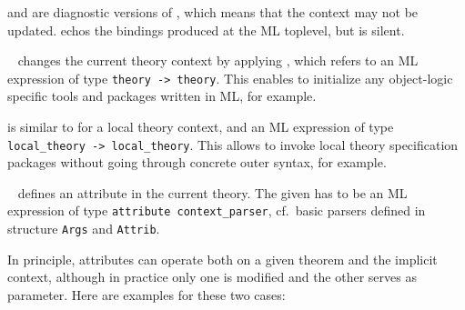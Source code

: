 \begin{isabellebody}
\begin{isamarkuptext}
\begin{description}
  \item \hyperlink{command.ML-val}{\mbox{}} and \hyperlink{command.ML-command}{\mbox{}} are diagnostic
  versions of \hyperlink{command.ML}{\mbox{}}, which means that the context may not be
  updated.  \hyperlink{command.ML-val}{\mbox{}} echos the bindings produced at the ML
  toplevel, but \hyperlink{command.ML-command}{\mbox{}} is silent.
  
  \item \hyperlink{command.setup}{\mbox{}}~ changes the current theory
  context by applying , which refers to an ML expression
  of type \verb|theory -> theory|.  This enables to initialize
  any object-logic specific tools and packages written in ML, for
  example.

  \item \hyperlink{command.local-setup}{\mbox{}} is similar to \hyperlink{command.setup}{\mbox{}} for
  a local theory context, and an ML expression of type \verb|local_theory -> local_theory|.  This allows to
  invoke local theory specification packages without going through
  concrete outer syntax, for example.

  \item \hyperlink{command.attribute-setup}{\mbox{}}~
  defines an attribute in the current theory.  The given  has to be an ML expression of type
  \verb|attribute context_parser|, cf.\ basic parsers defined in
  structure \verb|Args| and \verb|Attrib|.

  In principle, attributes can operate both on a given theorem and the
  implicit context, although in practice only one is modified and the
  other serves as parameter.  Here are examples for these two cases:


\end{description}
\end{isamarkuptext}
\end{isabellebody}
